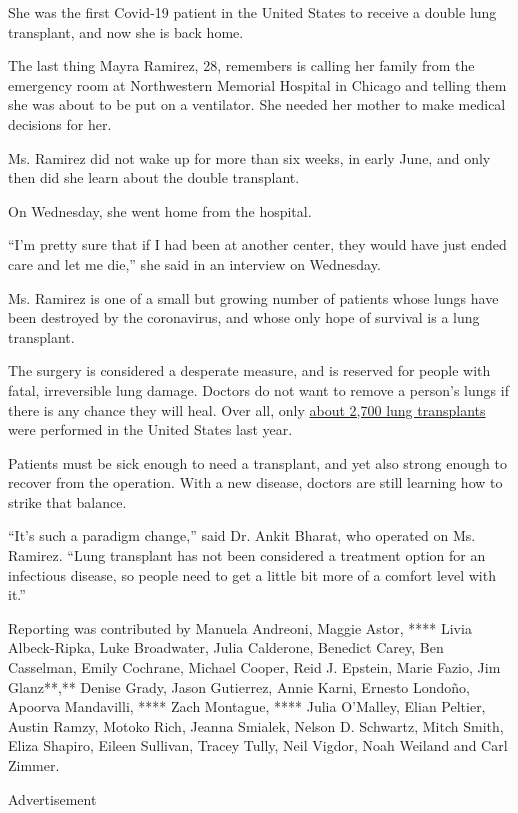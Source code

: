 She was the first Covid-19 patient in the United States to receive a
double lung transplant, and now she is back home.

The last thing Mayra Ramirez, 28, remembers is calling her family from
the emergency room at Northwestern Memorial Hospital in Chicago and
telling them she was about to be put on a ventilator. She needed her
mother to make medical decisions for her.

Ms. Ramirez did not wake up for more than six weeks, in early June, and
only then did she learn about the double transplant.

On Wednesday, she went home from the hospital.

``I'm pretty sure that if I had been at another center, they would have
just ended care and let me die,'' she said in an interview on Wednesday.

Ms. Ramirez is one of a small but growing number of patients whose lungs
have been destroyed by the coronavirus, and whose only hope of survival
is a lung transplant.

The surgery is considered a desperate measure, and is reserved for
people with fatal, irreversible lung damage. Doctors do not want to
remove a person's lungs if there is any chance they will heal. Over all,
only \href{https://unos.org/data/transplant-trends/}{about 2,700 lung
transplants} were performed in the United States last year.

Patients must be sick enough to need a transplant, and yet also strong
enough to recover from the operation. With a new disease, doctors are
still learning how to strike that balance.

``It's such a paradigm change,'' said Dr. Ankit Bharat, who operated on
Ms. Ramirez. ``Lung transplant has not been considered a treatment
option for an infectious disease, so people need to get a little bit
more of a comfort level with it.''

Reporting was contributed by Manuela Andreoni, Maggie Astor, **** Livia
Albeck-Ripka, Luke Broadwater, Julia Calderone, Benedict Carey, Ben
Casselman, Emily Cochrane, Michael Cooper, Reid J. Epstein, Marie Fazio,
Jim Glanz**,** Denise Grady, Jason Gutierrez, Annie Karni, Ernesto
Londoño, Apoorva Mandavilli, **** Zach Montague, **** Julia O'Malley,
Elian Peltier, Austin Ramzy, Motoko Rich, Jeanna Smialek, Nelson D.
Schwartz, Mitch Smith, Eliza Shapiro, Eileen Sullivan, Tracey Tully,
Neil Vigdor, Noah Weiland and Carl Zimmer.

Advertisement

